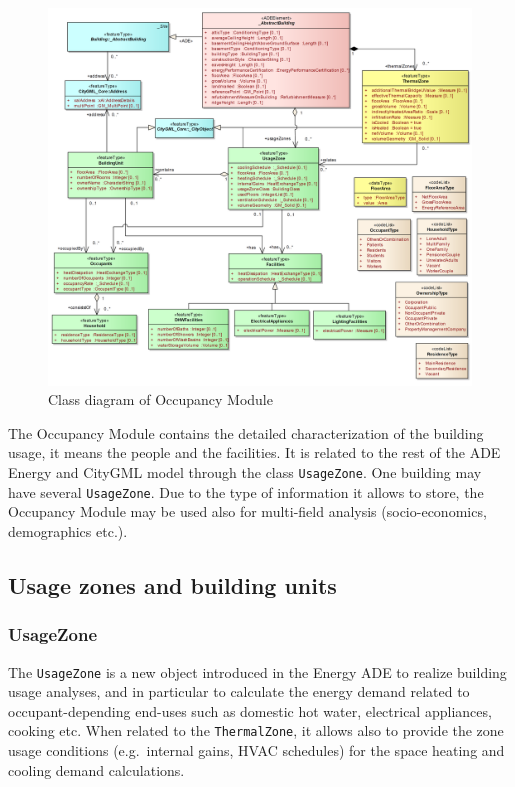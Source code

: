 \documentclass[a4paper,12pt]{article}
\begin{document}
\begin{figure}[htbp]
\centering
\includegraphics{fig/class_occupancy.png}
\caption{Class diagram of Occupancy Module}
\end{figure}

The Occupancy Module contains the detailed characterization of the
building usage, it means the people and the facilities. It is related to
the rest of the ADE Energy and CityGML model through the class
\lstinline!UsageZone!. One building may have several
\lstinline!UsageZone!. Due to the type of information it allows to
store, the Occupancy Module may be used also for multi-field analysis
(socio-economics, demographics etc.).

\subsection{Usage zones and building
units}\label{usage-zones-and-building-units}

\subsubsection{UsageZone}\label{usagezone}

The \lstinline!UsageZone! is a new object introduced in the Energy ADE
to realize building usage analyses, and in particular to calculate the
energy demand related to occupant-depending end-uses such as domestic
hot water, electrical appliances, cooking etc. When related to the
\lstinline!ThermalZone!, it allows also to provide the zone usage
conditions (e.g.~internal gains, HVAC schedules) for the space heating
and cooling demand calculations.
\end{document}
